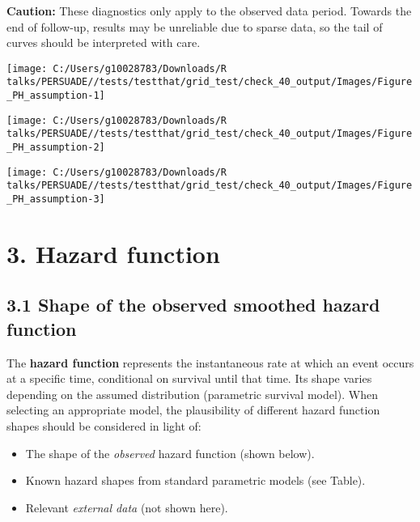\documentclass[
]{article}
\providecommand{\tightlist}{%
  \setlength{\itemsep}{0pt}\setlength{\parskip}{0pt}}
\begin{document}
\textbf{Caution:} These diagnostics only apply to the observed data
period. Towards the end of follow-up, results may be unreliable due to
sparse data, so the tail of curves should be interpreted with care.

\clearpage

\begin{flushleft}\texttt{[image: C:/Users/g10028783/Downloads/R talks/PERSUADE//tests/testthat/grid\_test/check\_40\_output/Images/Figure\_PH\_assumption-1]} \end{flushleft}

\begin{flushleft}\texttt{[image: C:/Users/g10028783/Downloads/R talks/PERSUADE//tests/testthat/grid\_test/check\_40\_output/Images/Figure\_PH\_assumption-2]} \end{flushleft}

\begin{flushleft}\texttt{[image: C:/Users/g10028783/Downloads/R talks/PERSUADE//tests/testthat/grid\_test/check\_40\_output/Images/Figure\_PH\_assumption-3]} \end{flushleft}

\clearpage

\section{3. Hazard function}\label{hazard-function}

\subsection{3.1 Shape of the observed smoothed hazard
function}\label{shape-of-the-observed-smoothed-hazard-function}

The \textbf{hazard function} represents the instantaneous rate at which
an event occurs at a specific time, conditional on survival until that
time. Its shape varies depending on the assumed distribution (parametric
survival model). When selecting an appropriate model, the plausibility
of different hazard function shapes should be considered in light of:

\begin{itemize}
\tightlist
\item
  The shape of the \emph{observed} hazard function (shown below).
\item
  Known hazard shapes from standard parametric models (see Table).
\item
  Relevant \emph{external data} (not shown here).
\end{itemize}
\end{document}
